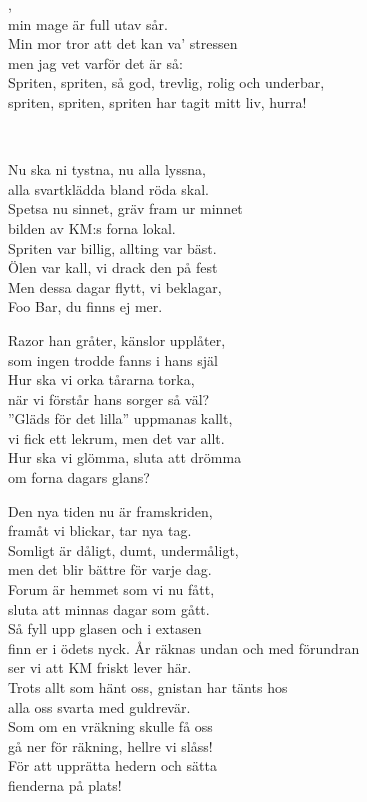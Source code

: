 ,\\
min mage är full utav sår.\\
Min mor tror att det kan va' stressen\\
men jag vet varför det är så:\\
Spriten, spriten, så god, trevlig, rolig och underbar,\\
spriten, spriten, spriten har tagit mitt liv, hurra!

\newpage


 \\       

\songtext{} 
Nu ska ni tystna, nu alla lyssna,\\
alla svartklädda bland röda skal.\\
Spetsa nu sinnet, gräv fram ur minnet\\
bilden av KM:s forna lokal.\\
Spriten var billig, allting var bäst.\\
Ölen var kall, vi drack den på fest\\
Men dessa dagar flytt, vi beklagar,\\
Foo Bar, du finns ej mer.

Razor han gråter, känslor upplåter,\\
som ingen trodde fanns i hans själ\\
Hur ska vi orka tårarna torka,\\
när vi förstår hans sorger så väl?\\
”Gläds för det lilla” uppmanas kallt,\\
vi fick ett lekrum, men det var allt.\\
Hur ska vi glömma, sluta att drömma\\
om forna dagars glans?

Den nya tiden nu är framskriden,\\
framåt vi blickar, tar nya tag.\\
Somligt är dåligt, dumt, undermåligt,\\
men det blir bättre för varje dag.\\
Forum är hemmet som vi nu fått,\\
sluta att minnas dagar som gått.\\
Så fyll upp glasen och i extasen\\
finn er i ödets nyck.
\newpage
År räknas undan och med förundran\\
ser vi att KM friskt lever här.\\
Trots allt som hänt oss, gnistan har tänts hos\\
alla oss svarta med guldrevär.\\
Som om en vräkning skulle få oss\\
gå ner för räkning, hellre vi slåss!\\
För att upprätta hedern och sätta\\
fienderna på plats!

